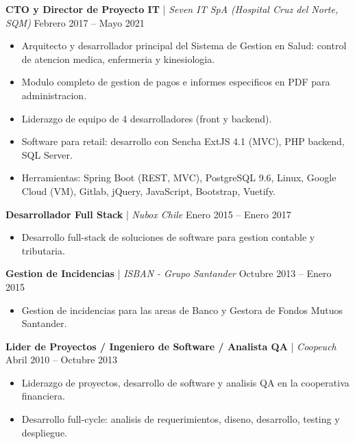 \documentclass[11pt,a4paper]{article}
\begin{document}
\vspace{8pt}

\textbf{CTO y Director de Proyecto IT} | \textit{Seven IT SpA (Hospital Cruz del Norte, SQM)} \hfill Febrero 2017 -- Mayo 2021 \\
\begin{itemize}[noitemsep, topsep=0pt]
    \item Arquitecto y desarrollador principal del Sistema de Gestion en Salud: control de atencion medica, enfermeria y kinesiologia.
    \item Modulo completo de gestion de pagos e informes especificos en PDF para administracion.
    \item Liderazgo de equipo de 4 desarrolladores (front y backend).
    \item Software para retail: desarrollo con Sencha ExtJS 4.1 (MVC), PHP backend, SQL Server.
    \item Herramientas: Spring Boot (REST, MVC), PostgreSQL 9.6, Linux, Google Cloud (VM), Gitlab, jQuery, JavaScript, Bootstrap, Vuetify.
\end{itemize}

\vspace{8pt}

\textbf{Desarrollador Full Stack} | \textit{Nubox Chile} \hfill Enero 2015 -- Enero 2017 \\
\begin{itemize}[noitemsep, topsep=0pt]
    \item Desarrollo full-stack de soluciones de software para gestion contable y tributaria.
\end{itemize}

\vspace{8pt}

\textbf{Gestion de Incidencias} | \textit{ISBAN - Grupo Santander} \hfill Octubre 2013 -- Enero 2015 \\
\begin{itemize}[noitemsep, topsep=0pt]
    \item Gestion de incidencias para las areas de Banco y Gestora de Fondos Mutuos Santander.
\end{itemize}

\vspace{8pt}

\textbf{Lider de Proyectos / Ingeniero de Software / Analista QA} | \textit{Coopeuch} \hfill Abril 2010 -- Octubre 2013 \\
\begin{itemize}[noitemsep, topsep=0pt]
    \item Liderazgo de proyectos, desarrollo de software y analisis QA en la cooperativa financiera.
    \item Desarrollo full-cycle: analisis de requerimientos, diseno, desarrollo, testing y despliegue.
\end{itemize}
\end{document}
